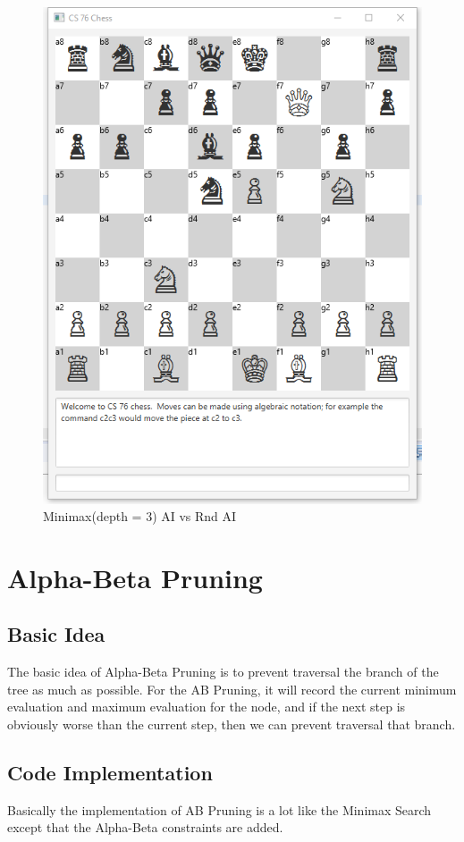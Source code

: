 \documentclass{article}
\begin{document}
\begin{figure}[H]
\centering
\includegraphics[width=0.7\linewidth]{max_3_rnd}
\caption{Minimax(depth = 3) AI vs Rnd AI}
\end{figure}

\section{Alpha-Beta Pruning}
\subsection{Basic Idea}
The basic idea of Alpha-Beta Pruning is to prevent traversal the branch of the tree as much as possible. For the AB Pruning, it will record the current minimum evaluation and maximum evaluation for the node, and if the next step is obviously worse than the current step, then we can prevent traversal that branch.

\subsection{Code Implementation}
Basically the implementation of AB Pruning is a lot like the Minimax Search except that the Alpha-Beta constraints are added.
\end{document}
